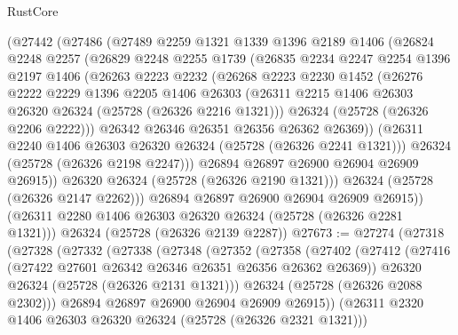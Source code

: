 \begin{lexlean}{RustCore}
\begin{coremodule}
      (@27442
        (@27486
          (@27489
            @2259
            @1321
            @1339
            @1396
            @2189
            @1406
            (@26824
              @2248
              @2257
              (@26829
                @2248
                @2255
                @1739
                (@26835
                  @2234
                  @2247
                  @2254
                  @1396
                  @2197
                  @1406
                  (@26263
                    @2223
                    @2232
                    (@26268
                      @2223
                      @2230
                      @1452
                      (@26276
                        @2222
                        @2229
                        @1396
                        @2205
                        @1406
                        @26303
                        (@26311 @2215 @1406 @26303 @26320 @26324 (@25728 (@26326 @2216 @1321)))
                        @26324
                        (@25728 (@26326 @2206 @2222)))
                      @26342
                      @26346
                      @26351
                      @26356
                      @26362
                      @26369))
                  (@26311 @2240 @1406 @26303 @26320 @26324 (@25728 (@26326 @2241 @1321)))
                  @26324
                  (@25728 (@26326 @2198 @2247)))
                @26894
                @26897
                @26900
                @26904
                @26909
                @26915))
            @26320
            @26324
            (@25728 (@26326 @2190 @1321)))
          @26324
          (@25728 (@26326 @2147 @2262)))
        @26894
        @26897
        @26900
        @26904
        @26909
        @26915))
    (@26311 @2280 @1406 @26303 @26320 @26324 (@25728 (@26326 @2281 @1321)))
    @26324
    (@25728 (@26326 @2139 @2287))
@27673 := @27274
    (@27318
      (@27328
        (@27332
          (@27338
            (@27348
              (@27352
                (@27358
                  (@27402
                    (@27412
                      (@27416 (@27422 @27601 @26342 @26346 @26351 @26356 @26362 @26369))
                      @26320
                      @26324
                      (@25728 (@26326 @2131 @1321)))
                    @26324
                    (@25728 (@26326 @2088 @2302)))
                  @26894
                  @26897
                  @26900
                  @26904
                  @26909
                  @26915))
              (@26311 @2320 @1406 @26303 @26320 @26324 (@25728 (@26326 @2321 @1321)))

\end{coremodule}
\end{lexlean}
